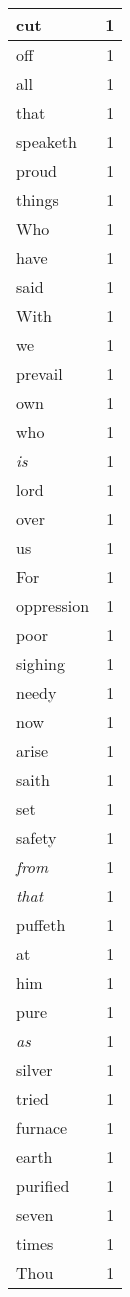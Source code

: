 \begin{center}
\begin{longtable}{l|r}
cut & 1 \\ \hline
off & 1 \\ \hline
all & 1 \\ \hline
that & 1 \\ \hline
speaketh & 1 \\ \hline
proud & 1 \\ \hline
things & 1 \\ \hline
Who & 1 \\ \hline
have & 1 \\ \hline
said & 1 \\ \hline
With & 1 \\ \hline
we & 1 \\ \hline
prevail & 1 \\ \hline
own & 1 \\ \hline
who & 1 \\ \hline
\emph{is} & 1 \\ \hline
lord & 1 \\ \hline
over & 1 \\ \hline
us & 1 \\ \hline
For & 1 \\ \hline
oppression & 1 \\ \hline
poor & 1 \\ \hline
sighing & 1 \\ \hline
needy & 1 \\ \hline
now & 1 \\ \hline
arise & 1 \\ \hline
saith & 1 \\ \hline
set & 1 \\ \hline
safety & 1 \\ \hline
\emph{from} & 1 \\ \hline
\emph{that} & 1 \\ \hline
puffeth & 1 \\ \hline
at & 1 \\ \hline
him & 1 \\ \hline
pure & 1 \\ \hline
\emph{as} & 1 \\ \hline
silver & 1 \\ \hline
tried & 1 \\ \hline
furnace & 1 \\ \hline
earth & 1 \\ \hline
purified & 1 \\ \hline
seven & 1 \\ \hline
times & 1 \\ \hline
Thou & 1 \\ \hline

\end{longtable}
\end{center}
